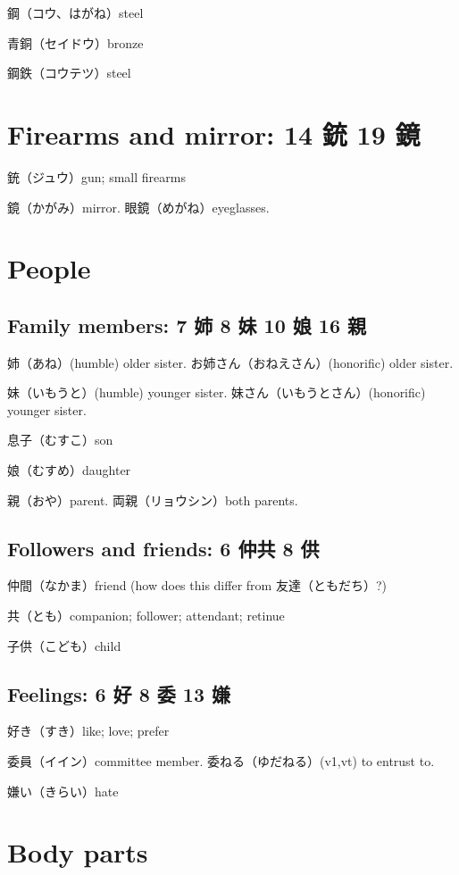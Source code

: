 鋼（コウ、はがね）steel

青銅（セイドウ）bronze

鋼鉄（コウテツ）steel

\section{Firearms and mirror: 14 銃 19 鏡}

銃（ジュウ）gun; small firearms

鏡（かがみ）mirror.
眼鏡（めがね）eyeglasses.

\section{People}

\subsection{Family members: 7 姉 8 妹 10 娘 16 親}

姉（あね）(humble) older sister.
お姉さん（おねえさん）(honorific) older sister.

妹（いもうと）(humble) younger sister.
妹さん（いもうとさん）(honorific) younger sister.

息子（むすこ）son

娘（むすめ）daughter

親（おや）parent.
両親（リョウシン）both parents.

\subsection{Followers and friends: 6 仲共 8 供}

仲間（なかま）friend (how does this differ from 友達（ともだち）?)

共（とも）companion; follower; attendant; retinue

子供（こども）child

\subsection{Feelings: 6 好 8 委 13 嫌}

好き（すき）like; love; prefer

委員（イイン）committee member.
委ねる（ゆだねる）(v1,vt) to entrust to.

嫌い（きらい）hate

\section{Body parts}

